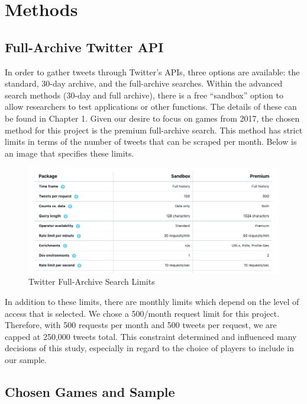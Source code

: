 \documentclass[12pt,twoside]{reedthesis}
\begin{document}
\section{Methods}\label{methods-1}

\subsection{Full-Archive Twitter API}\label{full-archive-twitter-api}

In order to gather tweets through Twitter's APIs, three options are
available: the standard, 30-day archive, and the full-archive searches.
Within the advanced search methods (30-day and full archive), there is a
free ``sandbox'' option to allow researchers to test applications or
other functions. The details of these can be found in Chapter 1. Given
our desire to focus on games from 2017, the chosen method for this
project is the premium full-archive search. This method has strict
limits in terms of the number of tweets that can be scraped per month.
Below is an image that specifies these limits.
\begin{figure}
\includegraphics[width=475px]{api_limits} \caption{Twitter Full-Archive Search Limits}\label{fig:unnamed-chunk-29}
\end{figure}
In addition to these limits, there are monthly limits which depend on
the level of access that is selected. We chose a 500/month request limit
for this project. Therefore, with 500 requests per month and 500 tweets
per request, we are capped at 250,000 tweets total. This constraint
determined and influenced many decisions of this study, especially in
regard to the choice of players to include in our sample.

\subsection{Chosen Games and Sample}\label{chosen-games-and-sample}
\end{document}
